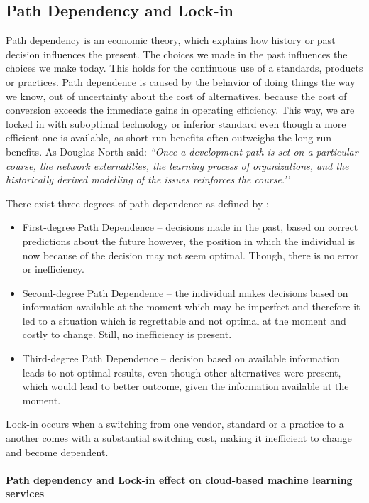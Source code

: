 \subsection{Path Dependency and Lock-in} \label{sec:path-depenency}
Path dependency is an economic theory, which explains how history or past decision influences the present. The choices we made in the past influences the choices we make today. This holds for the continuous use of a standards, products or practices. Path dependence is caused by the behavior of doing things the way we know, out of uncertainty about the cost of alternatives, because the cost of conversion exceeds the immediate gains in operating efficiency. This way, we are locked in with suboptimal technology or inferior standard even though a more efficient one is available, as short-run benefits often outweighs the long-run benefits. As Douglas North said: \textit{``Once a development path is set on a particular course, the network externalities, the learning process of organizations, and the historically derived modelling of the issues reinforces the course.’’}

There exist three degrees of path dependence as defined by \cite{Liebowitz2001WinnersTechnology}:
\begin{itemize}[noitemsep]
    \item First-degree Path Dependence -- decisions made in the past, based on correct predictions about the future however, the position in which the individual is now because of the decision may not seem optimal. Though, there is no error or inefficiency.
    \item Second-degree Path Dependence -- the individual makes decisions based on information available at the moment which may be imperfect and therefore it led to a situation which is regrettable and not optimal at the moment and costly to change. Still, no inefficiency is present.
    \item Third-degree Path Dependence -- decision based on available information leads to not optimal results, even though other alternatives were present, which would lead to better outcome, given the information available at the moment.
\end{itemize}
  
Lock-in occurs when a switching from one vendor, standard or a practice to a another comes with a substantial switching cost, making it inefficient to change and become dependent.

\paragraph{Path dependency and Lock-in effect on cloud-based machine learning services}

